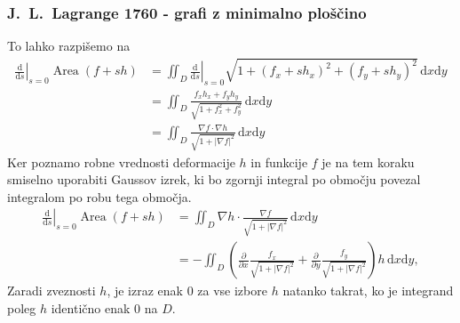 \documentclass[8pt]{beamer}
\theoremstyle{definition}
\theoremstyle{remark}
\theoremstyle{plain}
\numberwithin{equation}{section}  %
\begin{document}
\begin{frame}
    \frametitle{J.~L.~Lagrange 1760 - grafi z minimalno ploščino}

    To lahko razpišemo na
    \begin{align*}
        \left.\frac{\mathrm{d}}{\mathrm{d} s}\right|_{s=0} \operatorname{Area}(f+s h) & =\left.\iint_{D} \frac{\mathrm{d}}{\mathrm{d} s}\right|_{s=0} \sqrt{1+\left(f_x+s h_x\right)^2+\left(f_y+s h_y\right)^2} \, \mathrm{d} x \mathrm{d} y \\
        & =\iint_{D} \frac{f_x h_x+f_y h_y}{\sqrt{1+f_x^2+f_y^2}} \, \mathrm{d} x \mathrm{d} y \\
        & =\iint_{D} \frac{\nabla f \cdot \nabla h}{\sqrt{1+|\nabla f|^2}} \, \mathrm{d} x \mathrm{d} y
    \end{align*}
    Ker poznamo robne vrednosti deformacije $h$ in funkcije $f$ je na tem koraku smiselno uporabiti Gaussov izrek, ki bo zgornji integral po območju povezal integralom po robu tega območja.
    \begin{align*}
        \left.\frac{\mathrm{d}}{\mathrm{d} s}\right|_{s=0} \operatorname{Area}(f+s h) & =\iint_{D} \nabla h \cdot \frac{\nabla f}{\sqrt{1+|\nabla f|^2}} \, \mathrm{d} x \mathrm{d} y \\
        & =-\iint_{D}\left(\frac{\partial}{\partial x} \frac{f_x}{\sqrt{1+|\nabla f|^2}}+\frac{\partial}{\partial y} \frac{f_y}{\sqrt{1+|\nabla f|^2}}\right) h \, \mathrm{d} x \mathrm{d} y,
    \end{align*}
    Zaradi zveznosti $h$, je izraz enak $0$ za vse izbore $h$ natanko takrat, ko je integrand poleg $h$ identično enak $0$ na $D$. 

\end{frame}
\end{document}

